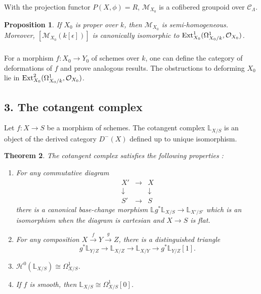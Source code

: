 \documentclass[11pt]{article}
\theoremstyle{plain}
\newtheorem{theorem}{Theorem}[section]
\newtheorem{proposition}[theorem]{Proposition}
\theoremstyle{definition}
\theoremstyle{remark}
\DeclareMathOperator{\Ext}{Ext}
\begin{document}
With the projection functor $P(X, \phi) = R$, $\mathcal{M}_{X_0}$ is a cofibered groupoid over $\mathcal{C}_\Lambda$.

\begin{proposition}
If $X_0$ is proper over $k$, then $\mathcal{M}_{X_0}$ is semi-homogeneous. Moreover, $[\mathcal{M}_{X_0}(k[\epsilon])]$ is canonically isomorphic to $\Ext^1_{X_0}(\Omega^1_{X_0/k}, \cO_{X_0})$.
\end{proposition}

\subsubsection{}
For a morphism $f: X_0 \to Y_0$ of schemes over $k$, one can define the category of deformations of $f$ and prove analogous results. The obstructions to deforming $X_0$ lie in $\Ext^2_{X_0}(\Omega^1_{X_0/k}, \cO_{X_0})$.

\subsection*{3. The cotangent complex}

Let $f: X \to S$ be a morphism of schemes. The cotangent complex $\mathbb{L}_{X/S}$ is an object of the derived category $D^-(X)$ defined up to unique isomorphism.

\begin{theorem}
The cotangent complex satisfies the following properties :
\begin{enumerate}[label=(\roman*)]
\item For any commutative diagram
\[
\begin{array}{ccc}
X' & \longrightarrow & X \\
\downarrow & & \downarrow \\
S' & \longrightarrow & S
\end{array}
\]
there is a canonical base-change morphism $\mathbb{L}g^* \mathbb{L}_{X/S} \to \mathbb{L}_{X'/S'}$ which is an isomorphism when the diagram is cartesian and $X \to S$ is flat.
\item For any composition $X \xrightarrow{f} Y \xrightarrow{g} Z$, there is a distinguished triangle
\[
g^* \mathbb{L}_{Y/Z} \longrightarrow \mathbb{L}_{X/Z} \longrightarrow \mathbb{L}_{X/Y} \longrightarrow g^* \mathbb{L}_{Y/Z}[1].
\]
\item $\mathcal{H}^0(\mathbb{L}_{X/S}) \cong \Omega^1_{X/S}$.
\item If $f$ is smooth, then $\mathbb{L}_{X/S} \cong \Omega^1_{X/S}[0]$.
\end{enumerate}
\end{theorem}
\end{document}
